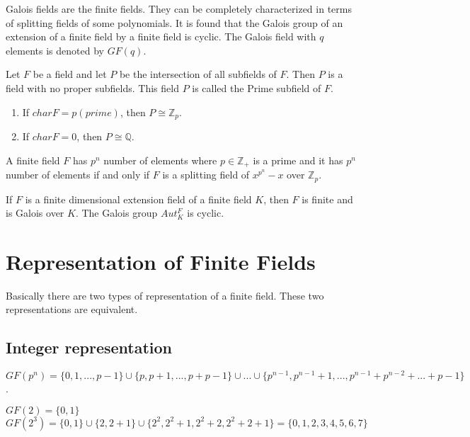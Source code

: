 Galois fields are the finite fields. They can be completely characterized in terms of splitting fields of some polynomials. It is found that the Galois group of an extension of a finite field by a finite field is cyclic. The Galois field with \(q\) elements is denoted by \(GF(q)\).

\begin{definition}
Let \(F\) be a field and let \(P\) be the intersection of all subfields of \(F\). Then \(P\) is a field with no proper subfields. This field \(P\) is called the Prime subfield of \(F\).
\end{definition}

\begin{enumerate}
\item If \(charF=p(prime)\), then \(P\cong {\mathbb{Z}}_p\).
\item If \(charF=0\), then \(P\cong \mathbb{Q}\).
\end{enumerate}

\begin{theorem}
A  finite field \(F\) has \(p^n\) number of elements where \(p \in \mathbb{Z}_+\) is a prime and it has \(p^n\) number of elements if and only if \(F\) is a splitting field of \(x^{p^n} - x\) over \(\mathbb{Z}_p\).\\
\end{theorem}

\begin{theorem}
  If \(F\) is a finite dimensional extension field of a finite field \(K\), then \(F\) is finite and is Galois over \(K\). The Galois group \(Aut_K^F\) is cyclic.
\end{theorem}

\section{Representation of Finite Fields}
Basically there are two types of representation of a finite field. These two representations are equivalent. 
\subsection{Integer representation}

\(GF(p^n)=\{0,1,...,p-1\} \cup \{p,p+1,...,p+p-1\} \cup ... \cup \{p^{n-1},p^{n-1}+1,...,p^{n-1}+p^{n-2}+...+p-1\}\).

\begin{example}
    \(GF(2)=\{0,1\}\)\\
    \(GF(2^3)=\{0,1\} \cup \{2,2+1\} \cup \{2^2,2^2+1,2^2+2,2^2+2+1\}=\{0,1,2,3,4,5,6,7\}\)
\end{example}

